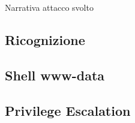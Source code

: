 \begin{cvletter}
   Narrativa attacco svolto
\subsection{Ricognizione}
\subsection{Shell www-data}
\subsection{Privilege Escalation}

   


\end{cvletter}

